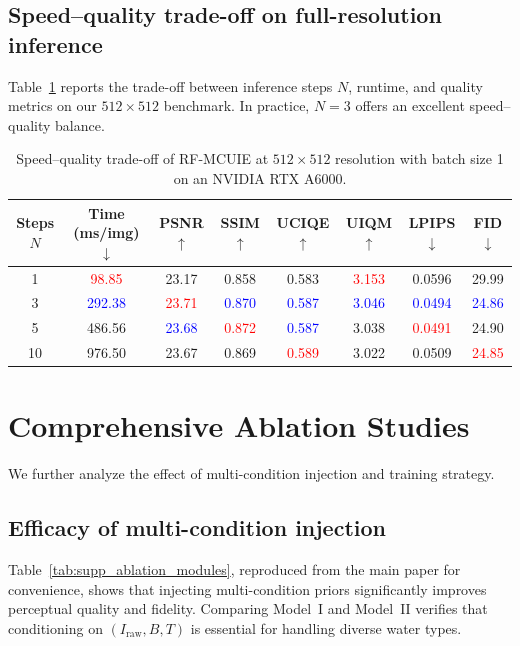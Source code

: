 \documentclass[runningheads]{llncs}
\newcommand{\best}[1]{\textcolor{red}{#1}}
\newcommand{\second}[1]{\textcolor{blue}{#1}}
\begin{document}
\subsection{Speed--quality trade-off on full-resolution inference}
\label{sec:supp_speed_quality}

Table~\ref{tab:supp_speed_quality} reports the trade-off between inference steps $N$, runtime, and quality metrics on our $512\times 512$ benchmark. In practice, $N=3$ offers an excellent speed--quality balance.

\begin{table}[t]
\centering
\small
\caption{Speed--quality trade-off of RF-MCUIE at $512\times 512$ resolution with batch size 1 on an NVIDIA RTX A6000.}
\label{tab:supp_speed_quality}
\begin{tabular}{@{}c c c c c c c c@{}}
\toprule
Steps $N$ & Time (ms/img) $\downarrow$ & PSNR $\uparrow$ & SSIM $\uparrow$ & UCIQE $\uparrow$ & UIQM $\uparrow$ & LPIPS $\downarrow$ & FID $\downarrow$ \\
\midrule
1  & \best{98.85}  & 23.17 & 0.858 & 0.583 & \best{3.153} & 0.0596 & 29.99 \\
3  & \second{292.38} & \best{23.71} & \second{0.870} & \second{0.587} & \second{3.046} & \second{0.0494} & \second{24.86} \\
5  & 486.56 & \second{23.68} & \best{0.872} & \second{0.587} & 3.038 & \best{0.0491} & 24.90 \\
10 & 976.50 & 23.67 & 0.869 & \best{0.589} & 3.022 & 0.0509 & \best{24.85} \\
\bottomrule
\end{tabular}
\end{table}

\section{Comprehensive Ablation Studies}
\label{sec:supp_ablation}

We further analyze the effect of multi-condition injection and training strategy.

\subsection{Efficacy of multi-condition injection}
Table~\ref{tab:supp_ablation_modules}, reproduced from the main paper for convenience, shows that injecting multi-condition priors significantly improves perceptual quality and fidelity.
Comparing Model~I and Model~II verifies that conditioning on $(I_{\mathrm{raw}},B,T)$ is essential for handling diverse water types.
\end{document}
